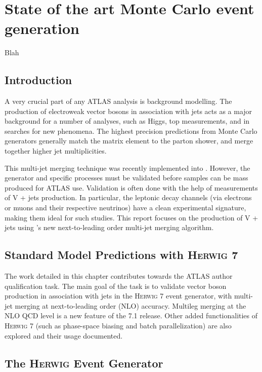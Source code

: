\chapter{State of the art Monte Carlo event generation}
\label{chap:pheno}

%
{Blah}

\section{Introduction}
A very crucial part of any ATLAS analysis is background modelling. The production of electroweak vector bosons in association with jets acts as a major background for a number of analyses, such as Higgs, top measurements, and in searches for new phenomena. The highest precision predictions from Monte Carlo generators generally match the matrix element to the parton shower, and merge together higher jet multiplicities. 

This multi-jet merging technique was recently implemented into . However, the generator and specific processes must be validated before samples can be mass produced for ATLAS use. Validation is often done with the help of measurements of V + jets production. In particular, the leptonic decay channels (via electrons or muons and their respective neutrinos) have a clean experimental signature, making them ideal for such studies. This report focuses on the production of V + jets using 's new next-to-leading order multi-jet merging algorithm.

\section{Standard Model Predictions with \textsc{Herwig 7}}

The work detailed in this chapter contributes towards the ATLAS author qualification task. The main goal of the task is to validate vector boson production in association with jets in the \textsc{Herwig 7} event generator, with multi-jet merging at next-to-leading order (NLO) accuracy. Multileg merging at the NLO QCD level is a new feature of the 7.1 release. Other added functionalities of \textsc{Herwig 7} (such as phase-space biasing and batch parallelization) are also explored and their usage documented. 

\section{The \textsc{Herwig} Event Generator}
\label{SM:herwig}

